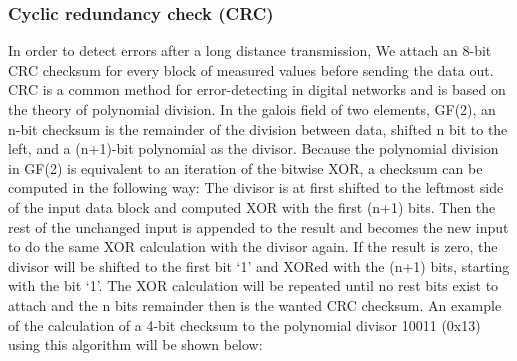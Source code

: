 \documentclass[a4paper]{scrreprt}
\begin{document}
\subsubsection{Cyclic redundancy check (CRC)}\label{chap:crc}
In order to detect errors after a long distance transmission, 
We attach an 8-bit CRC checksum for every block of measured values before sending the data out. \\
CRC is a common method for error-detecting in digital networks and is based on the theory of polynomial division. 
In the galois field of two elements, GF(2),
an n-bit checksum is the remainder of the division between data, shifted n bit to the left, and a (n+1)-bit polynomial as the divisor.
Because the polynomial division in GF(2) is equivalent to an iteration of the bitwise XOR, a checksum can be computed in the following way:
The divisor is at first shifted to the leftmost side of the input data block and computed XOR with the first (n+1) bits.
Then the rest of the unchanged input is appended to the result and becomes the new input to do the same XOR calculation with the divisor again.
If the result is zero, the divisor will be shifted to the first bit `1' and XORed with the (n+1) bits, starting with the bit `1'. 
The XOR calculation will be repeated until no rest bits exist to attach and the n bits remainder then is the wanted CRC checksum.
An example of the calculation of a 4-bit checksum to the polynomial divisor 10011 (0x13) using this algorithm will be shown below:
\end{document}
